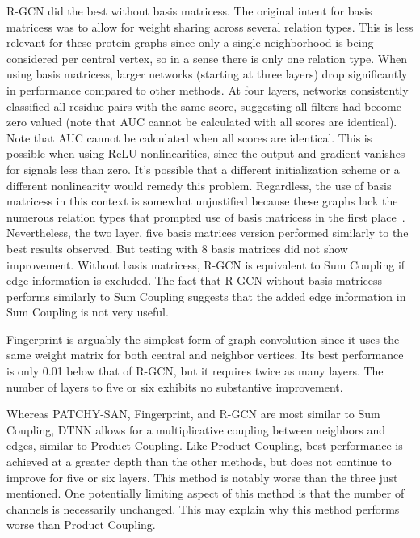 R-GCN did the best without basis matricess.
The original intent for basis matricess was to allow for weight sharing across several relation types.
This is less relevant for these protein graphs since only a single neighborhood is being considered per central vertex, so in a sense there is only one relation type.
When using basis matricess, larger networks (starting at three layers) drop significantly in performance compared to other methods.
At four layers, networks consistently classified all residue pairs with the same score, suggesting all filters had become zero valued (note that AUC cannot be calculated with all scores are identical).
Note that AUC cannot be calculated when all scores are identical.
This is possible when using ReLU nonlinearities, since the output and gradient vanishes for signals less than zero.
It's possible that a different initialization scheme or a different nonlinearity would remedy this problem.
Regardless, the use of basis matricess in this context is somewhat unjustified because these graphs lack the numerous relation types that prompted use of basis matricess in the first place~\cite{schlichtkrull2017}.
Nevertheless, the two layer, five basis matrices version performed similarly to the best results observed.
But testing with 8 basis matrices did not show improvement.
Without basis matricess, R-GCN is equivalent to Sum Coupling if edge information is excluded.
The fact that R-GCN without basis matricess performs similarly to Sum Coupling suggests that the added edge information in Sum Coupling is not very useful.

Fingerprint is arguably the simplest form of graph convolution since it uses the same weight matrix for both central and neighbor vertices.
Its best performance is only 0.01 below that of R-GCN, but it requires twice as many layers.
The number of layers to five or six exhibits no substantive improvement. 

Whereas PATCHY-SAN, Fingerprint, and R-GCN are most similar to Sum Coupling, DTNN allows for a multiplicative coupling between neighbors and edges, similar to Product Coupling.
Like Product Coupling, best performance is achieved at a greater depth than the other methods, but does not continue to improve for five or six layers. 
This method is notably worse than the three just mentioned.
One potentially limiting aspect of this method is that the number of channels is necessarily unchanged.
This may explain why this method performs worse than Product Coupling.


